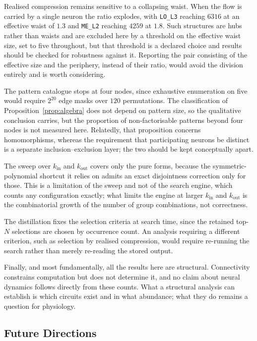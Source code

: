\documentclass[12pt,a4paper,oneside]{article}
\theoremstyle{definition}
\theoremstyle{plain}
\newcommand{\kin}{k_{\mathrm{in}}}
\newcommand{\kout}{k_{\mathrm{out}}}
\newcommand{\code}[1]{\texttt{#1}}
\begin{document}
Realised compression remains sensitive to a collapsing waist. When the flow
is carried by a single neuron the ratio explodes, with \code{LO\_L3}
reaching $6316$ at an effective waist of $1.3$ and \code{ME\_L2} reaching
$4259$ at $1.8$. Such structures are hubs rather than waists and are
excluded here by a threshold on the effective waist size, set to five
throughout, but that threshold is a declared choice and results should be
checked for robustness against it. Reporting the pair consisting of the
effective size and the periphery, instead of their ratio, would avoid the
division entirely and is worth considering.

The pattern catalogue stops at four nodes, since exhaustive enumeration on
five would require $2^{20}$ edge masks over $120$ permutations. The
classification of Proposition~\ref{prop:algebra} does not depend on pattern
size, so the qualitative conclusion carries, but the proportion of
non-factorisable patterns beyond four nodes is not measured here. Relatedly,
that proposition concerns homomorphisms, whereas the requirement that
participating neurons be distinct is a separate inclusion--exclusion layer;
the two should be kept conceptually apart.

The sweep over $\kin$ and $\kout$ covers only the pure forms, because the
symmetric-polynomial shortcut it relies on admits an exact disjointness
correction only for those. This is a limitation of the sweep and not of the
search engine, which counts any configuration exactly; what limits the engine
at larger $\kin$ and $\kout$ is the combinatorial growth of the number of
group combinations, not correctness.

The distillation fixes the selection criteria at search time, since the
retained top-$N$ selections are chosen by occurrence count. An analysis
requiring a different criterion, such as selection by realised compression,
would require re-running the search rather than merely re-reading the
stored output.

Finally, and most fundamentally, all the results here are structural.
Connectivity constrains computation but does not determine it, and no claim
about neural dynamics follows directly from these counts. What a structural
analysis can establish is which circuits exist and in what abundance; what
they do remains a question for physiology.

\subsection{Future Directions}
\label{sec:future}
\end{document}
